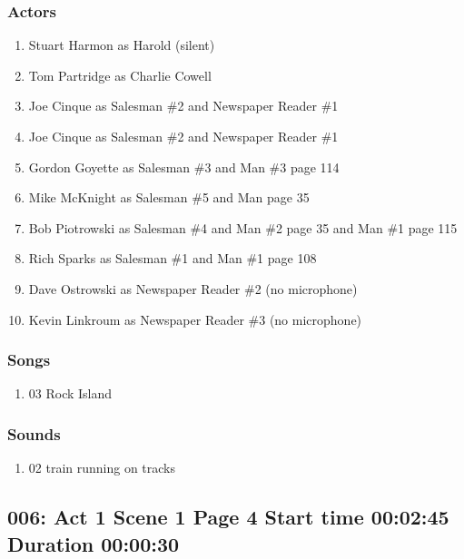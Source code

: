 \subsubsection{Actors}
\begin{enumerate}
\item Stuart Harmon as Harold (silent)
\item Tom Partridge as Charlie Cowell
\item Joe Cinque as Salesman \#2 and Newspaper Reader \#1
\item Joe Cinque as Salesman \#2 and Newspaper Reader \#1
\item Gordon Goyette as Salesman \#3 and Man \#3 page 114
\item Mike McKnight as Salesman \#5 and Man page 35
\item Bob Piotrowski as Salesman \#4 and Man \#2 page 35 and Man \#1 page 115
\item Rich Sparks as Salesman \#1 and Man \#1 page 108
\item Dave Ostrowski as Newspaper Reader \#2 (no microphone)
\item Kevin Linkroum as Newspaper Reader \#3 (no microphone)
\end{enumerate}

\subsubsection{Songs}
\begin{enumerate}
\item 03 Rock Island
\end{enumerate}\subsubsection{Sounds}
\begin{enumerate}
\item 02 train running on tracks
\end{enumerate}
\subsection{006: Act 1 Scene 1 Page 4 Start time 00:02:45 Duration 00:00:30}

